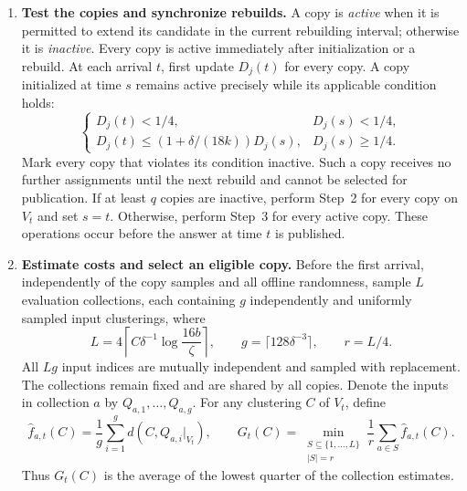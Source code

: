\documentclass[11pt]{article}
\begin{document}
\begin{enumerate}
\item \textbf{Test the copies and synchronize rebuilds.}
A copy is \emph{active} when it is permitted to extend its candidate
in the current rebuilding interval; otherwise it is \emph{inactive}.
Every copy is active immediately after initialization or a rebuild.
At each arrival $t$, first update $D_j(t)$ for every copy. A copy
initialized at time $s$ remains active precisely while its applicable
condition holds:
\[
 \begin{cases}
 D_j(t)<1/4,&D_j(s)<1/4,\\[2pt]
 D_j(t)\le(1+\delta/(18k))D_j(s),&D_j(s)\ge1/4.
 \end{cases}
\]
Mark every copy that violates its condition inactive. Such a copy
receives no further assignments until the next rebuild and cannot
be selected for publication. If at least $q$ copies are inactive,
perform Step~2 for every copy on $V_t$ and set $s=t$. Otherwise,
perform Step~3 for every active copy. These operations occur before
the answer at time $t$ is published.

\item \textbf{Estimate costs and select an eligible copy.}
Before the first arrival, independently of the copy samples and all
offline randomness, sample $L$ evaluation collections, each containing
$g$ independently and uniformly sampled input clusterings, where
\[
 L=4\left\lceil C\delta^{-1}\log\frac{16b}{\zeta}\right\rceil,
 \qquad g=\lceil128\delta^{-3}\rceil,
 \qquad r=L/4.
\]
All $Lg$ input indices are mutually independent and sampled with
replacement. The collections remain fixed and are
shared by all copies. Denote the inputs in collection $a$ by
$Q_{a,1},\ldots,Q_{a,g}$. For any clustering $C$ of $V_t$, define
\[
 \widehat f_{a,t}(C)=\frac1g\sum_{i=1}^g d(C,Q_{a,i}|_{V_t}),
 \qquad
 G_t(C)=\min_{\substack{S\subseteq\{1,\ldots,L\}\\|S|=r}}
          \frac1r\sum_{a\in S}\widehat f_{a,t}(C).
\]
Thus $G_t(C)$ is the average of the lowest quarter of the collection
estimates.


\end{enumerate}
\end{document}

